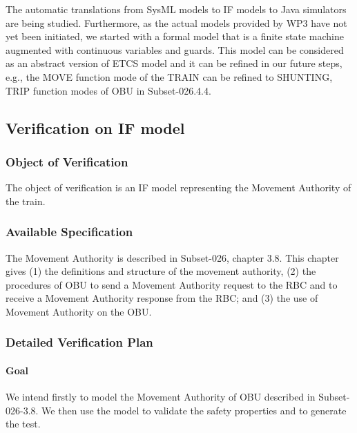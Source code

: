 \documentclass{template/openetcs_article}
\begin{document}
The automatic translations from SysML models to IF models to Java simulators are
being studied. Furthermore, as the actual models provided by WP3 have not yet
been initiated, we started with a formal model that is a finite state machine
augmented with continuous variables and guards. This model can be considered as
an abstract version of ETCS model and it can be refined in our future steps,
e.g., the MOVE function mode of the TRAIN can be refined to SHUNTING,
TRIP function modes of OBU in Subset-026.4.4.

\subsection{Verification on IF model}
\subsubsection{Object of Verification}
The object of verification is an IF model representing the Movement Authority of
the train.

\subsubsection{Available Specification}
The Movement Authority is described in Subset-026, chapter 3.8. This chapter
gives (1) the definitions and structure of the movement authority, 
(2) the procedures of OBU to send a Movement Authority request to
the RBC and to receive a Movement Authority response from the RBC;
and (3) the use of Movement Authority on the OBU.


\subsubsection{Detailed Verification Plan}

\paragraph{Goal} 
We intend firstly to model the Movement Authority of OBU described in
Subset-026-3.8. We then use the model to validate the safety
properties and to generate the test.
\end{document}
